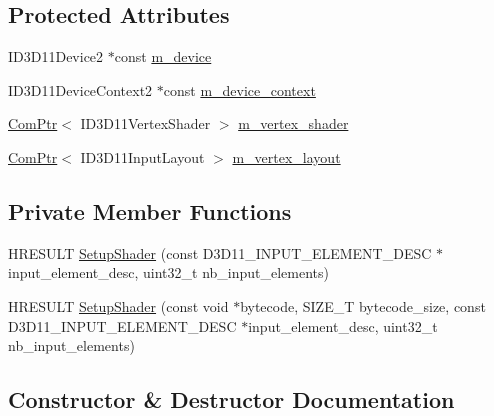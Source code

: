 \subsection*{Protected Attributes}
\begin{DoxyCompactItemize}
\item 
I\+D3\+D11\+Device2 $\ast$const \hyperlink{classmage_1_1_vertex_shader_a112021bb8067fb4a66870b125403354a}{m\+\_\+device}
\item 
I\+D3\+D11\+Device\+Context2 $\ast$const \hyperlink{classmage_1_1_vertex_shader_a1c286b3eafd0a0b45beb2b17065f0f0e}{m\+\_\+device\+\_\+context}
\item 
\hyperlink{namespacemage_ae74f374780900893caa5555d1031fd79}{Com\+Ptr}$<$ I\+D3\+D11\+Vertex\+Shader $>$ \hyperlink{classmage_1_1_vertex_shader_a0b2b02abae4cb226c115d7f1c5464a54}{m\+\_\+vertex\+\_\+shader}
\item 
\hyperlink{namespacemage_ae74f374780900893caa5555d1031fd79}{Com\+Ptr}$<$ I\+D3\+D11\+Input\+Layout $>$ \hyperlink{classmage_1_1_vertex_shader_a9b9895650b8c7f80af846d75f7d9ddda}{m\+\_\+vertex\+\_\+layout}
\end{DoxyCompactItemize}
\subsection*{Private Member Functions}
\begin{DoxyCompactItemize}
\item 
H\+R\+E\+S\+U\+LT \hyperlink{classmage_1_1_vertex_shader_a8b4115b041227ebe6a4ab8511eb5b8ea}{Setup\+Shader} (const D3\+D11\+\_\+\+I\+N\+P\+U\+T\+\_\+\+E\+L\+E\+M\+E\+N\+T\+\_\+\+D\+E\+SC $\ast$input\+\_\+element\+\_\+desc, uint32\+\_\+t nb\+\_\+input\+\_\+elements)
\item 
H\+R\+E\+S\+U\+LT \hyperlink{classmage_1_1_vertex_shader_af096750cfbb86b38f090935bb6e5accd}{Setup\+Shader} (const void $\ast$bytecode, S\+I\+Z\+E\+\_\+T bytecode\+\_\+size, const D3\+D11\+\_\+\+I\+N\+P\+U\+T\+\_\+\+E\+L\+E\+M\+E\+N\+T\+\_\+\+D\+E\+SC $\ast$input\+\_\+element\+\_\+desc, uint32\+\_\+t nb\+\_\+input\+\_\+elements)
\end{DoxyCompactItemize}


\subsection{Constructor \& Destructor Documentation}
\hypertarget{classmage_1_1_vertex_shader_a0add7dbd710d444fbd5f7c9dc05e2dbb}{}\label{classmage_1_1_vertex_shader_a0add7dbd710d444fbd5f7c9dc05e2dbb} 
